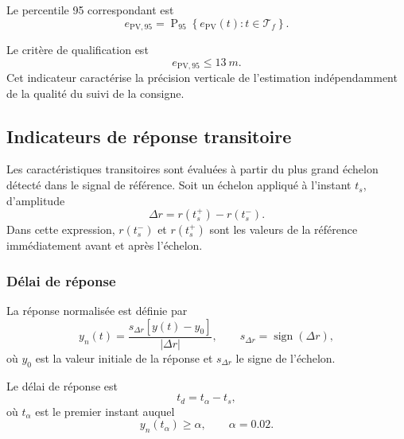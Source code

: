 \documentclass[11pt,a4paper,oneside]{report}
\begin{document}
Le percentile 95 correspondant est
\begin{equation}
	e_{\mathrm{PV},95}
	=
	\operatorname{P}_{95}
	\left\{
	e_{\mathrm{PV}}(t):
	t\in\mathcal T_f
	\right\}.
	\label{eq_vertical_estimation_p95}
\end{equation}

Le critère de qualification est
\begin{equation}
	e_{\mathrm{PV},95}
	\leq
	\SI{13}{m}.
	\label{eq_vertical_assurance_requirement}
\end{equation}
Cet indicateur caractérise la précision verticale de l'estimation indépendamment de la qualité du suivi de la consigne.

\subsection{Indicateurs de réponse transitoire}

Les caractéristiques transitoires sont évaluées à partir du plus grand échelon détecté dans le signal de référence. Soit un échelon appliqué à l'instant $t_s$, d'amplitude
\begin{equation}
	\Delta r
	=
	r(t_s^{+})-r(t_s^{-}).
	\label{eq_qualification_step_amplitude}
\end{equation}
Dans cette expression, $r(t_s^{-})$ et $r(t_s^{+})$ sont les valeurs de la référence immédiatement avant et après l'échelon.

\subsubsection{Délai de réponse}

La réponse normalisée est définie par
\begin{equation}
	y_n(t)
	=
	\frac{
		s_{\Delta r}\left[y(t)-y_0\right]
	}{
		|\Delta r|
	},
	\qquad
	s_{\Delta r}=\operatorname{sign}(\Delta r),
	\label{eq_normalized_step_response}
\end{equation}
où $y_0$ est la valeur initiale de la réponse et $s_{\Delta r}$ le signe de l'échelon.

Le délai de réponse est
\begin{equation}
	t_d=t_{\alpha}-t_s,
	\label{eq_qualification_delay}
\end{equation}
où $t_{\alpha}$ est le premier instant auquel
\begin{equation}
	y_n(t_{\alpha})\geq\alpha,
	\qquad
	\alpha=0.02.
	\label{eq_delay_detection_threshold}
\end{equation}
\end{document}
